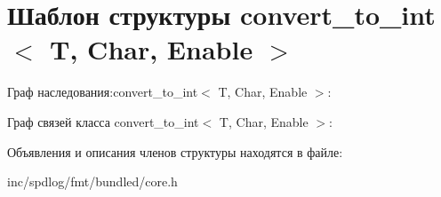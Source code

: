 \hypertarget{structconvert__to__int}{}\section{Шаблон структуры convert\+\_\+to\+\_\+int$<$ T, Char, Enable $>$}
\label{structconvert__to__int}


Граф наследования\+:convert\+\_\+to\+\_\+int$<$ T, Char, Enable $>$\+:


Граф связей класса convert\+\_\+to\+\_\+int$<$ T, Char, Enable $>$\+:


Объявления и описания членов структуры находятся в файле\+:\begin{DoxyCompactItemize}
\item 
inc/spdlog/fmt/bundled/core.\+h\end{DoxyCompactItemize}
